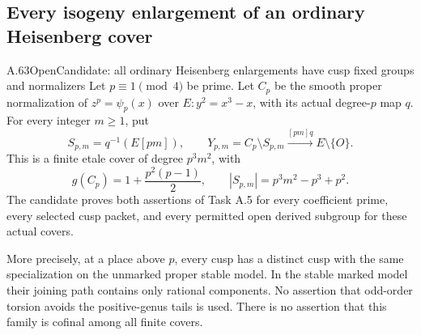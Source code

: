 \subsection{Every isogeny enlargement of an ordinary Heisenberg cover}

\begin{statement}{A.63}{Open}{Candidate: all ordinary Heisenberg enlargements have cusp fixed groups and normalizers}
Let \(p\equiv1\pmod4\) be prime. Let \(C_p\) be the smooth
proper normalization of \(z^p=\psi_p(x)\) over
\(E:y^2=x^3-x\), with its actual degree-\(p\) map \(q\).
For every integer \(m\ge1\), put
\[
 S_{p,m}=q^{-1}(E[pm]),\qquad
 Y_{p,m}=C_p\setminus S_{p,m}
       \xrightarrow{[pm]q} E\setminus\{O\}.
                                                        \tag{A.63.1}
\]
This is a finite etale cover of degree \(p^3m^2\), with
\[
 g(C_p)=1+\frac{p^2(p-1)}2,\qquad
 |S_{p,m}|=p^3m^2-p^3+p^2.                              \tag{A.63.2}
\]
The candidate proves both assertions of Task A.5 for every
coefficient prime, every selected cusp packet, and every
permitted open derived subgroup for these actual covers.

More precisely, at a place above \(p\), every cusp has a
distinct cusp with the same specialization on the unmarked
proper stable model. In the stable marked model their joining
path contains only rational components. No assertion that
odd-order torsion avoids the positive-genus tails is used.
There is no assertion that this family is cofinal among all
finite covers.
\end{statement}

